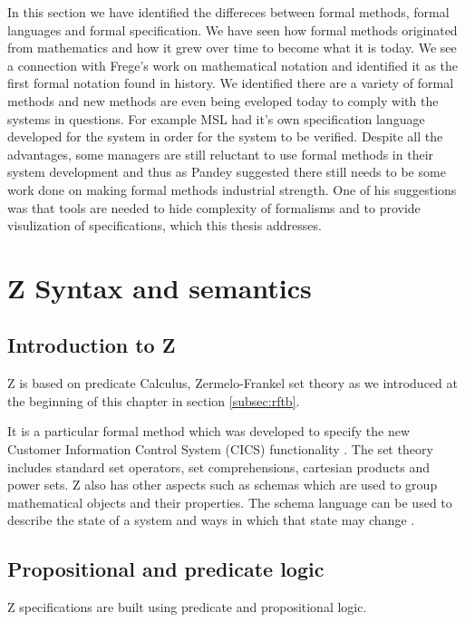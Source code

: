 In this section we have identified the differeces between formal methods, formal languages and formal specification. We have seen how formal methods originated from mathematics and how it grew over time to become what it is today. We see a connection with Frege's work on mathematical notation and identified it as the first formal notation found in history. We identified there are a variety of formal methods and new methods are even being eveloped today to comply with the systems in questions. For example MSL had it's own specification language developed for the system in order for the system to be verified. Despite all the advantages, some managers are still reluctant to use formal methods in their system development and thus as Pandey suggested there still needs to be some work done on making formal methods industrial strength. One of his suggestions was that tools are needed to hide complexity of formalisms and to provide visulization of specifications, which this thesis addresses.

\section{Z Syntax and semantics}
\label{sec:theznotation}


\subsection{Introduction to Z}


Z is based on predicate Calculus, Zermelo-Frankel set theory as we introduced at the beginning of this chapter in section \ref{subsec:rftb}.

It is a particular formal method which was developed to specify the new Customer Information Control System (CICS) functionality \cite{cics}. The set theory includes standard set operators, set comprehensions, cartesian products and power sets. Z also has other aspects such as schemas which are used to group mathematical objects and their properties. The schema language can be used to describe the state of a system and ways in which that state may change \cite{Woodcock:1996:UZS:235337}.

\subsection{Propositional and predicate logic}

Z specifications are built using predicate and propositional logic.

